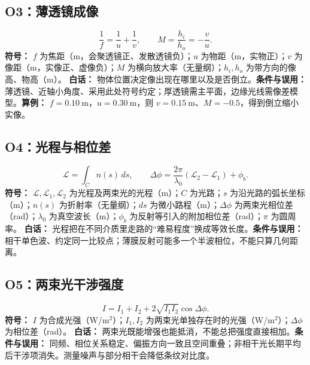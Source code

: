 \documentclass[UTF8,zihao=-4,openany,oneside,fontset=windows]{ctexbook}
\begin{document}
\subsection{O3：薄透镜成像}
\begin{equation}
\frac1f=\frac1u+\frac1v,\qquad M=\frac{h_i}{h_o}=-\frac vu.
\end{equation}
\textbf{符号：} $f$ 为焦距（m，会聚透镜正、发散透镜负）；$u$ 为物距（m，实物正）；$v$ 为像距（m，实像正、虚像负）；$M$ 为横向放大率（无量纲）；$h_i,h_o$ 为带方向的像高、物高（m）。
\textbf{白话：} 物体位置决定像出现在哪里以及是否倒立。\textbf{条件与误用：} 薄透镜、近轴小角度、采用此处符号约定；厚透镜需主平面，边缘光线需像差模型。\textbf{算例：} $f=0.10\ \mathrm m$，$u=0.30\ \mathrm m$，则 $v=0.15\ \mathrm m$、$M=-0.5$，得到倒立缩小实像。

\subsection{O4：光程与相位差}
\begin{equation}
\mathcal L=\int_C n(s)\,ds,\qquad \Delta\phi=\frac{2\pi}{\lambda_0}(\mathcal L_2-\mathcal L_1)+\phi_b.
\end{equation}
\textbf{符号：} $\mathcal L,\mathcal L_1,\mathcal L_2$ 为光程及两束光的光程（m）；$C$ 为光路；$s$ 为沿光路的弧长坐标（m）；$n(s)$ 为折射率（无量纲）；$ds$ 为微小路程（m）；$\Delta\phi$ 为两束光相位差（rad）；$\lambda_0$ 为真空波长（m）；$\phi_b$ 为反射等引入的附加相位差（rad）；$\pi$ 为圆周率。
\textbf{白话：} 光程把在不同介质里走路的“难易程度”换成等效长度。\textbf{条件与误用：} 相干单色波、约定同一比较点；薄膜反射可能多一个半波相位，不能只算几何距离。

\subsection{O5：两束光干涉强度}
\begin{equation}
I=I_1+I_2+2\sqrt{I_1I_2}\cos\Delta\phi.
\end{equation}
\textbf{符号：} $I$ 为合成光强（W/m$^2$）；$I_1,I_2$ 为两束光单独存在时的光强（W/m$^2$）；$\Delta\phi$ 为相位差（rad）。
\textbf{白话：} 两束光既能增强也能抵消，不能总把强度直接相加。\textbf{条件与误用：} 同频、相位关系稳定、偏振方向一致且空间重叠；非相干光长期平均后干涉项消失。测量噪声与部分相干会降低条纹对比度。
\end{document}
